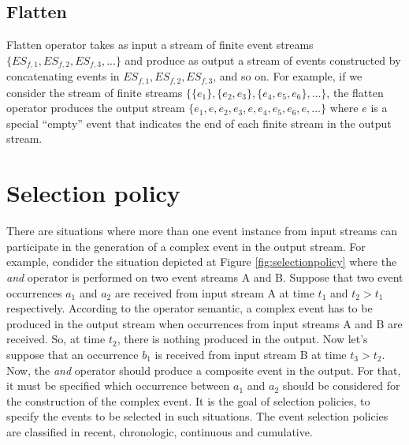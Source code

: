 \subsection{Flatten}
 Flatten operator takes as input a stream of finite event streams $\{ES_{f,1}, ES_{f,2}, ES_{f,3}, ...\}$  and produce as output a stream of events constructed by concatenating events in $ES_{f,1}, ES_{f,2}, ES_{f,3}$, and so on. 
For example, if we consider the stream of finite streams $\{\{e_1\}, \{e_2, e_3\}, \{e_4, e_5, e_6\}, …\}$, the flatten operator produces the output stream $\{e_1, e, e_2, e_3,e, e_4, e_5, e_6, e, …\}$ where $e$ is a special “empty” event that indicates the end of each finite stream in the output stream.

\section{Selection policy}
\label{ch3:sec4}
There are situations where more than one event instance from input streams can participate in the generation of a complex event in the output stream. For example, condider the situation depicted at Figure \ref{fig:selectionpolicy} where the \textit{and} operator is performed on two event streams A and B. Suppose that two event occurrences $a_1$ and $a_2$ are received from input stream A at time $t_1$ and $t_2 > t_1$ respectively. According to the operator semantic, a complex event has to be produced in the output stream when occurrences from input streams A and B are received. So, at time $t_2$, there is nothing produced in the output. Now let's suppose that an occurrence $b_1$ is received from input stream B at time $t_3 > t_2$. Now, the \textit{and} operator should produce a composite event in the output. For that, it must be specified which occurrence between $a_1$ and $a_2$ should be considered for the construction of the complex event. It is the goal of selection policies, to specify the events to be selected in such situations. The event selection policies are classified in recent, chronologic,  continuous and cumulative.

